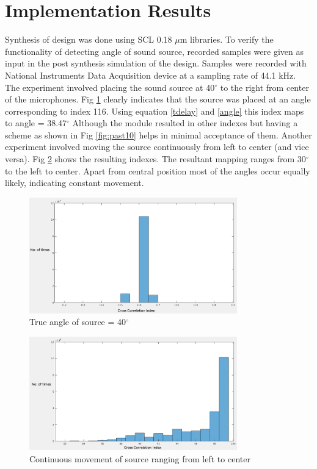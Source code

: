 \documentclass[conference]{IEEEtran}
\begin{document}
\section{Implementation Results}

Synthesis of design was done using SCL 0.18 $\mu$m libraries. To verify the functionality of detecting angle of sound source, recorded samples were given as input in the post synthesis simulation of the design. Samples were recorded with National Instruments Data Acquisition device at a sampling rate of 44.1 kHz. The experiment involved placing the sound source at 40$^\circ$ to the right from center of the microphones. Fig \ref{fig:right} clearly indicates that the source was placed at an angle corresponding to index 116. Using equation \ref{tdelay} and \ref{angle} this index maps to angle = 38.47$^\circ$ Although the module resulted in other indexes but having a scheme as shown in Fig \ref{fig:past10} helps in minimal acceptance of them. Another experiment involved moving the source continuously from left to center (and vice versa). Fig \ref{fig:left} shows the resulting indexes. The resultant mapping ranges from 30$^\circ$ to the left to center. Apart from central position most of the angles occur equally likely, indicating constant movement. 

\begin{figure}
    \centering
    \includegraphics[width = 9cm]{right.png}
    \caption{True angle of source = 40$^\circ$}
    \label{fig:right}
\end{figure}

\begin{figure}
    \centering
    \includegraphics[width = 9cm]{left.png}
    \caption{Continuous movement of source ranging from left to center}
    \label{fig:left}
\end{figure}
\end{document}
